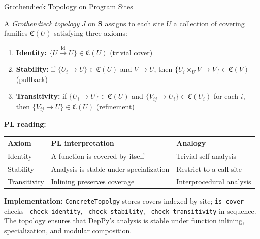 \documentclass[aspectratio=169,11pt]{beamer}
\newcommand{\Cov}{\mathfrak{C}}
\newcommand{\Cat}{\mathbf{S}}
\begin{document}
\begin{frame}{Grothendieck Topology on Program Sites}

A \emph{Grothendieck topology} $J$ on $\Cat$ assigns to each site $U$ a
collection of covering families $\Cov(U)$ satisfying three axioms:

\vspace{0.3em}
\begin{enumerate}
  \item \textbf{Identity:} $\{U \xrightarrow{\mathrm{id}} U\} \in \Cov(U)$ \hfill
        {\small (trivial cover)}
  \item \textbf{Stability:} if $\{U_i \to U\} \in \Cov(U)$ and $V \to U$,
        then $\{U_i \times_U V \to V\} \in \Cov(V)$ \hfill
        {\small (pullback)}
  \item \textbf{Transitivity:} if $\{U_i \to U\} \in \Cov(U)$ and
        $\{V_{ij} \to U_i\} \in \Cov(U_i)$ for each $i$, then
        $\{V_{ij} \to U\} \in \Cov(U)$ \hfill
        {\small (refinement)}
\end{enumerate}

\vspace{0.3em}
\textbf{PL reading:}

\vspace{0.2em}
{\small
\begin{tabular}{@{}lll@{}}
\textbf{Axiom} & \textbf{PL interpretation} & \textbf{Analogy} \\
\hline
Identity     & A function is covered by itself          & Trivial self-analysis \\
Stability    & Analysis is stable under specialization  & Restrict to a call-site \\
Transitivity & Inlining preserves coverage              & Interprocedural analysis \\
\end{tabular}
}

\vspace{0.4em}
{\small \textbf{Implementation:} \texttt{ConcreteTopolgy} stores covers indexed by site;
\texttt{is\_cover} checks \texttt{\_check\_identity}, \texttt{\_check\_stability},
\texttt{\_check\_transitivity} in sequence.
The topology ensures that DepPy's analysis is stable under function inlining,
specialization, and modular composition.}

\end{frame}
\end{document}
